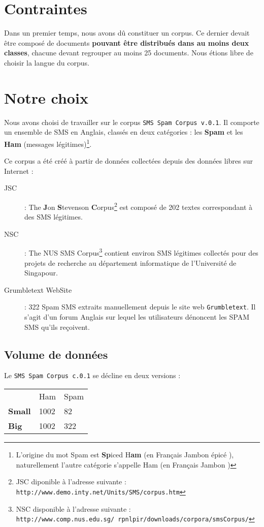 \section{Contraintes}
Dans un premier temps, nous avons dû constituer un corpus. Ce dernier devait être composé de documents \textbf{pouvant être distribués dans au moins deux classes}, chacune devant regrouper au moins 25 documents. Nous étions libre de choisir la langue du corpus.

\section{Notre choix}
Nous avons choisi de travailler sur le corpus \texttt{SMS Spam Corpus v.0.1}. Il comporte un ensemble de SMS en Anglais, classés en deux catégories : les \textbf{Spam} et les \textbf{Ham} (messages légitimes)\footnote{L'origine du mot Spam est \og \textbf{Sp}iced H\textbf{am} \fg{} (en Français \og Jambon épicé \fg{}), naturellement l'autre catégorie s'appelle \og Ham \fg{} (en Français \og Jambon \fg{})}.

Ce corpus a été créé à partir de données collectées depuis des données libres sur Internet :

\begin{description}
\item[JSC] : The \textbf{J}on \textbf{S}tevenson \textbf{C}orpus\footnote{JSC diponible à l'adresse suivante : \texttt{http://www.demo.inty.net/Units/SMS/corpus.htm}} est composé de 202 textes correspondant à des SMS légitimes.
\item[NSC] : The NUS SMS Corpus\footnote{NSC disponible à l'adresse suivante : \texttt{http://www.comp.nus.edu.sg/~rpnlpir/downloads/corpora/smsCorpus/}} contient environ  SMS légitimes collectés pour des projets de recherche au département informatique de l'Université de Singapour.
\item[Grumbletext WebSite] : 322 Spam SMS extraits manuellement depuis le site web \texttt{Grumbletext}. Il s'agit d'un forum Anglais sur lequel les utilisateurs dénoncent les SPAM SMS qu'ils reçoivent.
\end{description}

\subsection*{Volume de données}

Le \texttt{SMS Spam Corpus c.0.1} se décline en deux versions : 

\nopagebreak
\begin{tabular}{p{3cm} p{4cm} p{4cm}}
 & Ham & Spam \\
\textbf{Small} & 1002 & 82 \\
\textbf{Big} & 1002 & 322 \\
\end{tabular}


